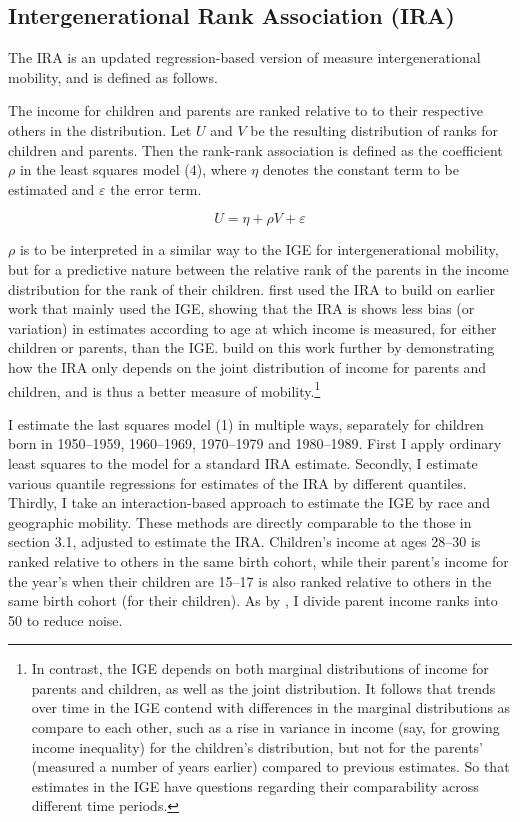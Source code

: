 \documentclass[notitlepage,12pt]{article}
\begin{document}
\subsection{Intergenerational Rank Association (IRA)}
The IRA is an updated regression-based version of measure intergenerational mobility, and is defined as follows.

The income for children and parents are ranked relative to to their respective others in the distribution.  Let $U$ and $V$ be the resulting distribution of ranks for children and parents.  Then the rank-rank association is defined as the coefficient $\rho$ in the least squares model (4), where $\eta$ denotes the constant term to be estimated and $\varepsilon$ the error term.

\begin{equation}
U=\eta + \rho V + \varepsilon
\end{equation}

$\rho$ is to be interpreted in a similar way to the IGE for intergenerational mobility, but for a predictive nature between the relative rank of the parents in the income distribution for the rank of their children.  \cite{dahl2008association} first used the IRA to build on earlier work that mainly used the IGE, showing that the IRA is shows less bias (or variation) in estimates according to age at which income is measured, for either children or parents, than the IGE.  \cite{chetty2014land} build on this work further by demonstrating how the IRA only depends on the joint distribution of income for parents and children, and is thus a better measure of mobility.\footnote{In contrast, the IGE depends on both marginal distributions of income for parents and children, as well as the joint distribution.  It follows that trends over time in the IGE contend with differences in the marginal distributions as compare to each other, such as a rise in variance in income (say, for growing income inequality) for the children's distribution, but not for the parents' (measured a number of years earlier) compared to previous estimates.  So that estimates in the IGE have questions regarding their comparability across different time periods.}

I estimate the last squares model (1) in multiple ways, separately for children born in 1950--1959, 1960--1969, 1970--1979 and 1980--1989.  First I apply ordinary least squares to the model for a standard IRA estimate.  Secondly, I estimate various quantile regressions for estimates of the IRA by different quantiles.  Thirdly, I take an interaction-based approach to estimate the IGE by race and geographic mobility.  These methods are directly comparable to the those in section 3.1, adjusted to estimate the IRA.  Children's income at ages 28--30 is ranked relative to others in the same birth cohort, while their parent's income for the year's when their children are 15--17 is also ranked relative to others in the same birth cohort (for their children).  As by \cite{chetty2014united}, I divide parent income ranks into 50 to reduce noise.
\end{document}

